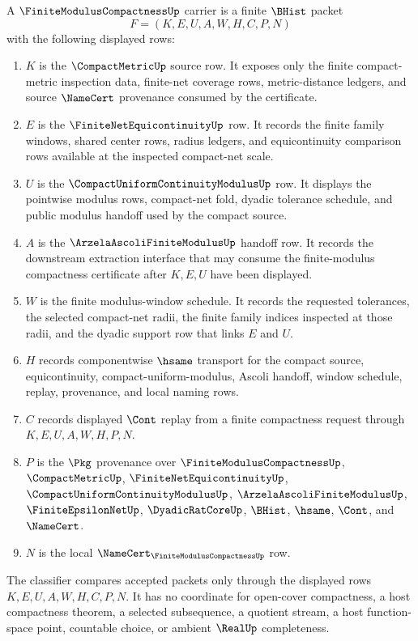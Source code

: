 \begin{definition}
\label{def:finite-modulus-compactness-carrier}
A $\FiniteModulusCompactnessUp$ carrier is a finite $\BHist$ packet
$$
F=(K,E,U,A,W,H,C,P,N)
$$
with the following displayed rows:
\begin{enumerate}
\item $K$ is the $\CompactMetricUp$ source row. It exposes only the finite compact-metric inspection data, finite-net coverage rows, metric-distance ledgers, and source $\NameCert$ provenance consumed by the certificate.
\item $E$ is the $\FiniteNetEquicontinuityUp$ row. It records the finite family windows, shared center rows, radius ledgers, and equicontinuity comparison rows available at the inspected compact-net scale.
\item $U$ is the $\CompactUniformContinuityModulusUp$ row. It displays the pointwise modulus rows, compact-net fold, dyadic tolerance schedule, and public modulus handoff used by the compact source.
\item $A$ is the $\ArzelaAscoliFiniteModulusUp$ handoff row. It records the downstream extraction interface that may consume the finite-modulus compactness certificate after $K,E,U$ have been displayed.
\item $W$ is the finite modulus-window schedule. It records the requested tolerances, the selected compact-net radii, the finite family indices inspected at those radii, and the dyadic support row that links $E$ and $U$.
\item $H$ records componentwise $\hsame$ transport for the compact source, equicontinuity, compact-uniform-modulus, Ascoli handoff, window schedule, replay, provenance, and local naming rows.
\item $C$ records displayed $\Cont$ replay from a finite compactness request through $K,E,U,A,W,H,P,N$.
\item $P$ is the $\Pkg$ provenance over $\FiniteModulusCompactnessUp$, $\CompactMetricUp$, $\FiniteNetEquicontinuityUp$, $\CompactUniformContinuityModulusUp$, $\ArzelaAscoliFiniteModulusUp$, $\FiniteEpsilonNetUp$, $\DyadicRatCoreUp$, $\BHist$, $\hsame$, $\Cont$, and $\NameCert$.
\item $N$ is the local $\NameCert_{\FiniteModulusCompactnessUp}$ row.
\end{enumerate}
The classifier compares accepted packets only through the displayed rows $K,E,U,A,W,H,C,P,N$. It has no coordinate for open-cover compactness, a host compactness theorem, a selected subsequence, a quotient stream, a host function-space point, countable choice, or ambient $\RealUp$ completeness.
\end{definition}

